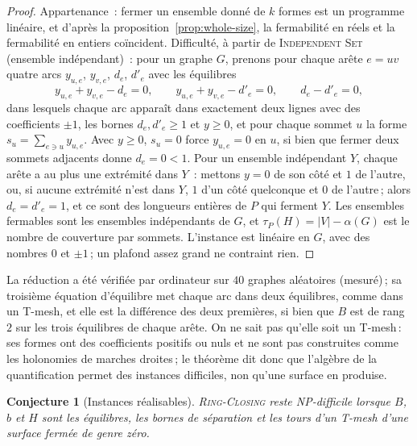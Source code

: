 \documentclass[11pt,a4paper]{article}
\newtheorem{conjecture}{Conjecture}
\newcommand{\shift}{s}
\newcommand{\RC}{\textup{\textsc{Ring-Closing}}}
\newenvironment{evidence}[3][]{}{}
\begin{document}
\begin{proof}
Appartenance~: fermer un ensemble donné de $k$ formes est un programme
linéaire, et d'après la proposition~\ref{prop:whole-size}, la fermabilité en
réels et la fermabilité en entiers coïncident. Difficulté, à partir de
\textup{\textsc{Independent Set}} (ensemble indépendant)~: pour un graphe
$G$, prenons pour chaque arête $e = uv$ quatre arcs $y_{u,e}$, $y_{v,e}$,
$d_e$, $d'_e$ avec les équilibres
\[
  y_{u,e} + y_{v,e} - d_e = 0, \qquad y_{u,e} + y_{v,e} - d'_e = 0, \qquad
  d_e - d'_e = 0 ,
\]
dans lesquels chaque arc apparaît dans exactement deux lignes avec des
coefficients $\pm1$, les bornes $d_e, d'_e \ge 1$ et $y \ge 0$, et pour
chaque sommet $u$ la forme $\shift_u = \sum_{e \ni u} y_{u,e}$. Avec $y \ge
0$, $\shift_u = 0$ force $y_{u,e} = 0$ en $u$, si bien que fermer deux sommets
adjacents donne $d_e = 0 < 1$. Pour un ensemble indépendant $Y$, chaque arête
a au plus une extrémité dans $Y$~: mettons $y = 0$ de son côté et $1$ de
l'autre, ou, si aucune extrémité n'est dans $Y$, $1$ d'un côté quelconque et
$0$ de l'autre\,; alors $d_e = d'_e = 1$, et ce sont des longueurs entières de
$P$ qui ferment $Y$. Les ensembles fermables sont les ensembles indépendants
de $G$, et $\tau_P(H) = |V| - \alpha(G)$ est le nombre de couverture par
sommets. L'instance est linéaire en $G$, avec des nombres $0$ et $\pm1$\,; un
plafond assez grand ne contraint rien.
\end{proof}

La réduction a été vérifiée par ordinateur sur $40$ graphes aléatoires
(mesuré)\,; sa troisième équation d'équilibre met chaque arc dans deux
équilibres, comme dans un T-mesh, et elle est la différence des deux
premières, si bien que $B$ est de rang $2$ sur les trois équilibres de chaque
arête. On ne sait pas qu'elle soit un T-mesh\,: ses
formes ont des coefficients positifs ou nuls et ne sont pas construites comme
les holonomies de marches droites\,; le théorème dit donc que l'algèbre de la
quantification permet des instances difficiles, non qu'une surface en
produise.

\begin{evidence}{open}{}
\begin{conjecture}[Instances réalisables]\label{conj:realize}
\RC{} reste NP-difficile lorsque $B$, $b$ et $H$ sont les équilibres, les
bornes de séparation et les tours d'un T-mesh d'une surface fermée de genre
zéro.
\end{conjecture}
\end{evidence}
\end{document}
